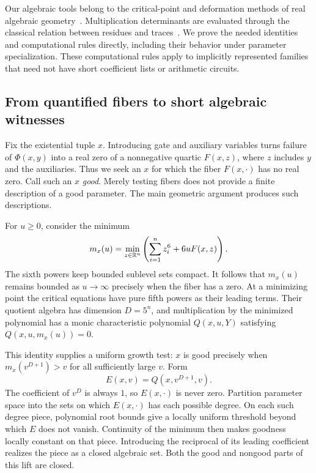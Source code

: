 Our algebraic tools belong to the critical-point and deformation methods
of real algebraic geometry~\cite{BasuPollackRoy2006}. Multiplication
determinants are evaluated through the classical relation between
residues and traces~\cite{SchejaStorch1975,CattaniDickensteinSturmfels1996}.
We prove the needed identities and computational rules directly, including
their behavior under parameter specialization. These computational rules
apply to implicitly represented families that need not have short
coefficient lists or arithmetic circuits.

\subsection{From quantified fibers to short algebraic witnesses}

Fix the existential tuple $x$. Introducing gate and auxiliary variables
turns failure of $\Phi(x,y)$ into a real zero of a nonnegative quartic
$F(x,z)$, where $z$ includes $y$ and the auxiliaries. Thus we seek an
$x$ for which the fiber $F(x,\cdot)$ has no real zero. Call such an $x$
\emph{good}. Merely testing fibers does not provide a finite description
of a good parameter. The main geometric argument produces such descriptions.

For $u\ge0$, consider the minimum
\[
 m_x(u)=\min_{z\in\mathbb R^n}\left(\sum_{i=1}^n z_i^6+6uF(x,z)\right).
\]
The sixth powers keep bounded sublevel sets compact. It follows that
$m_x(u)$ remains bounded as $u\to\infty$ precisely when the fiber has
a zero. At a minimizing point the critical equations have pure fifth
powers as their leading terms. Their quotient algebra has dimension
$D=5^n$, and multiplication by the minimized polynomial has a monic
characteristic polynomial $Q(x,u,Y)$ satisfying
$Q(x,u,m_x(u))=0$.

This identity supplies a uniform growth test: $x$ is good precisely when
$m_x(v^{D+1})>v$ for all sufficiently large $v$. Form
\[
                         E(x,v)=Q(x,v^{D+1},v).
\]
The coefficient of $v^D$ is always $1$, so $E(x,\cdot)$ is never zero.
Partition parameter space into the sets on which $E(x,\cdot)$ has each
possible degree. On each such degree piece, polynomial root bounds give
a locally uniform threshold beyond which $E$ does not vanish.
Continuity of the minimum then makes goodness locally constant on that
piece. Introducing the reciprocal of its leading coefficient realizes
the piece as a closed algebraic set. Both the good and nongood parts
of this lift are closed.

